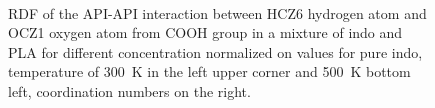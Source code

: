 \begin{figure}[htb!]
	\centering
	\\
	\vspace{-0.3cm}
	\caption{RDF of the API-API interaction between HCZ6 hydrogen atom and OCZ1 oxygen atom from COOH group in a mixture of indo and PLA for different concentration normalized on values for pure indo, temperature of 300~K in the left upper corner and 500~K bottom left, coordination numbers on the right.}
	\label{fig:indo_RDF_}
\end{figure}



